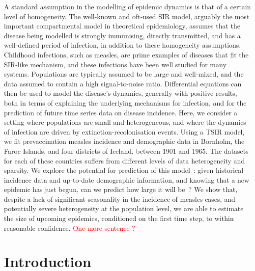 \documentclass[10pt]{article}
\begin{document}
A standard assumption in the modelling of epidemic dynamics is that of a certain level of homogeneity. The well-known and oft-used SIR model, arguably the most important compartmental model in theoretical epidemiology, assumes that the disease being modelled is strongly immunising, directly transmitted, and has a well-defined period of infection, in addition to these homogeneity assumptions. Childhood infections, such as measles, are prime examples of diseases that fit the SIR-like mechanism, and these infections have been well studied for many systems. Populations are typically assumed to be large and well-mixed, and the data assumed to contain a high signal-to-noise ratio. Differential equations can then be used to model the disease's dynamics, generally with positive results, both in terms of explaining the underlying mechanisms for infection, and for the prediction of future time series data on disease incidence. Here, we consider a setting where populations are small and heterogeneous, and where the dynamics of infection are driven by extinction-recolonisation events. Using a TSIR model, we fit prevaccination measles incidence and demographic data in Bornholm, the Faroe Islands, and four districts of Iceland, between 1901 and 1965. The datasets for each of these countries suffers from different levels of data heterogeneity and sparsity. We explore the potential for prediction of this model~: given historical incidence data and up-to-date demographic information, and knowing that a new epidemic has just begun, can we predict how large it will be~? We show that, despite a lack of significant seasonality in the incidence of measles cases, and potentially severe heterogeneity at the population level, we are able to estimate the size of upcoming epidemics, conditioned on the first time step, to within reasonable confidence. \textcolor{red}{One more sentence ?}















\section*{Introduction}
\end{document}
